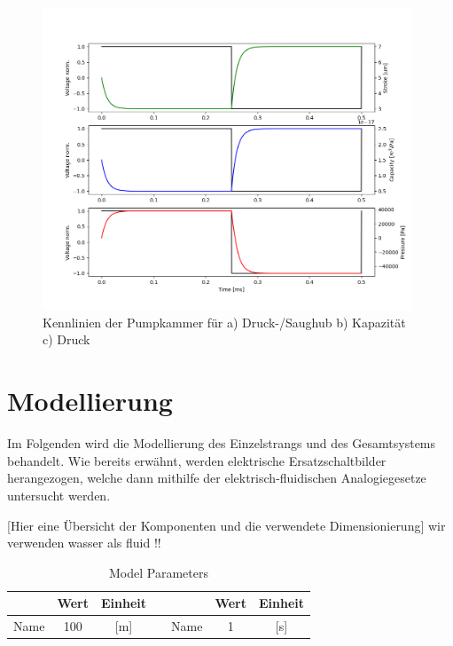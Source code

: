\documentclass[fontsize=12pt, a4paper]{scrartcl}
\begin{document}
\begin{figure}[H]
	\centering
	\includegraphics[width=0.98\textwidth]{bilder/Kennlinien/Chamber_kennlinie.PNG}
	\caption{Kennlinien der Pumpkammer für a) Druck-/Saughub b) Kapazität c) Druck}
	\label{fig:kammerkennlinie}
\end{figure}




\section{Modellierung}

Im Folgenden wird die Modellierung des Einzelstrangs und des Gesamtsystems behandelt.
Wie bereits erwähnt, werden elektrische Ersatzschaltbilder herangezogen, welche dann mithilfe der elektrisch-fluidischen Analogiegesetze untersucht werden.

[Hier eine Übersicht der Komponenten und die verwendete Dimensionierung]
wir verwenden wasser als fluid !!

\begin{table}[H]
\begin{tabular}[h]{c|c|c|c|c|c|c}
	  & Wert & Einheit & & & Wert & Einheit\\
	\hline
	Name & 100 & [m] & & Name & 1 & [s] \\
\end{tabular}
\caption{\label{tab:modelparameters} Model Parameters}
\end{table}

\newpage
\end{document}
